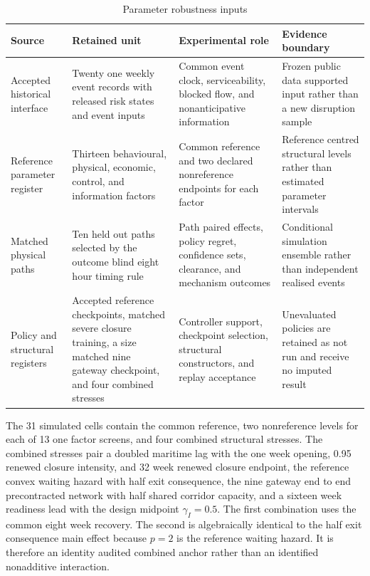\documentclass[a4paper,fleqn]{cas-sc}
\begin{document}
\begingroup
\setlength{\tabcolsep}{4pt}
\begin{table}[t]
\centering
\caption{Parameter robustness inputs}
\label{tab:534-robustness-inputs}
\begin{tabular}{>{\RaggedRight\arraybackslash}p{}
                >{\RaggedRight\arraybackslash}p{}
                >{\RaggedRight\arraybackslash}p{}
                >{\RaggedRight\arraybackslash}p{}}
\toprule
Source & Retained unit & Experimental role & Evidence boundary \\
\midrule
Accepted historical interface
& Twenty one weekly event records with released risk states and event inputs
& Common event clock, serviceability, blocked flow, and nonanticipative information
& Frozen public data supported input rather than a new disruption sample \\
Reference parameter register
& Thirteen behavioural, physical, economic, control, and information factors
& Common reference and two declared nonreference endpoints for each factor
& Reference centred structural levels rather than estimated parameter intervals \\
Matched physical paths
& Ten held out paths selected by the outcome blind eight hour timing rule
& Path paired effects, policy regret, confidence sets, clearance, and mechanism outcomes
& Conditional simulation ensemble rather than independent realised events \\
Policy and structural registers
& Accepted reference checkpoints, matched severe closure training, a size matched nine gateway checkpoint, and four combined stresses
& Controller support, checkpoint selection, structural constructors, and replay acceptance
& Unevaluated policies are retained as not run and receive no imputed result \\
\bottomrule
\end{tabular}
\end{table}
\endgroup

The 31 simulated cells contain the common reference, two nonreference levels
for each of 13 one factor screens, and four combined structural stresses. The
combined stresses pair a doubled maritime lag with the one week opening, 0.95
renewed closure intensity, and 32 week renewed closure endpoint, the reference
convex waiting hazard with half exit consequence, the nine gateway end to end
precontracted network with half shared corridor capacity, and a sixteen week
readiness lead with the design midpoint $\gamma_I=0.5$. The first combination
uses the common eight week recovery. The second is algebraically identical to
the half exit consequence main effect because $p=2$ is the reference waiting
hazard. It is therefore an identity audited combined anchor rather than an
identified nonadditive interaction.
\end{document}
